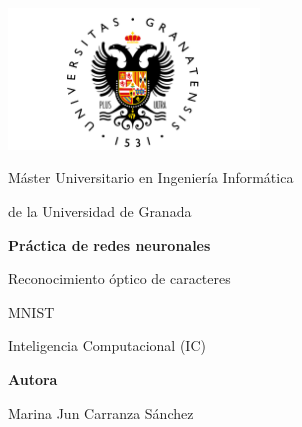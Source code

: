 \documentclass[12pt]{article}
\begin{document}
\begin{titlepage}
    \centering
    \begin{minipage}{1\textwidth}
    	\raisebox{-0.7\height}
    	{\includegraphics[width=0.5\textwidth]{UGR-Logo}}
    \end{minipage}
    
    \vspace{1.5cm}
    
    {\Large Máster Universitario en Ingeniería Informática
    	
    	de la Universidad de Granada \par}
    
    \vspace{1.5cm}
    
    {\Huge \textbf{Práctica de redes neuronales}
    	
    	\vspace{0.6cm}
    	
    	Reconocimiento óptico de caracteres
    	
    	MNIST
    	\par}
    
    \vspace{1.5cm}
    
    {\LARGE {Inteligencia Computacional (IC)} \par}
    
    \vspace{1.5cm}
    
    \vfill
    
    {\Large \textbf{Autora} \par}
    {\Large Marina Jun Carranza Sánchez \par}
    \vspace{0.5cm}
    
\end{titlepage}
\end{document}
